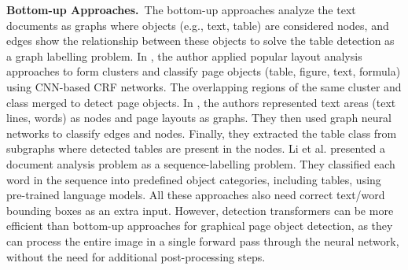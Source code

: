 \documentclass[sn-mathphys]{sn-jnl}\jyear{2021}\theoremstyle{thmstyleone}\newtheorem{theorem}{Theorem}\newtheorem{proposition}[theorem]{Proposition}\theoremstyle{thmstyletwo}\newtheorem{example}{Example}\newtheorem{remark}{Remark}\theoremstyle{thmstylethree}\newtheorem{definition}{Definition}\usepackage{amsmath}
\begin{document}
\noindent\textbf {Bottom-up Approaches.}~The bottom-up approaches analyze the text documents as graphs where objects (e.g., text, table) are considered nodes, and edges show the relationship between these objects to solve the table detection as a graph labelling problem. In \cite{Li64}, the author applied popular layout analysis approaches to form clusters and classify page objects (table, figure, text, formula) using CNN-based CRF networks. The overlapping regions of the same cluster and class merged to detect page objects. In \cite{Riba65, Martin66}, the authors represented text areas (text lines, words) as nodes and page layouts as graphs. They then used graph neural networks to classify edges and nodes. Finally, they extracted the table class from subgraphs where detected tables are present in the nodes. Li et al. \cite{Li49} presented a document analysis problem as a sequence-labelling problem. They classified each word in the sequence into predefined object categories, including tables, using pre-trained language models. All these approaches also need correct text/word bounding boxes as an extra input. However, detection transformers can be more efficient than bottom-up approaches for graphical page object detection, as they can process the entire image in a single forward pass through the neural network, without the need for additional post-processing steps.\\
\end{document}
